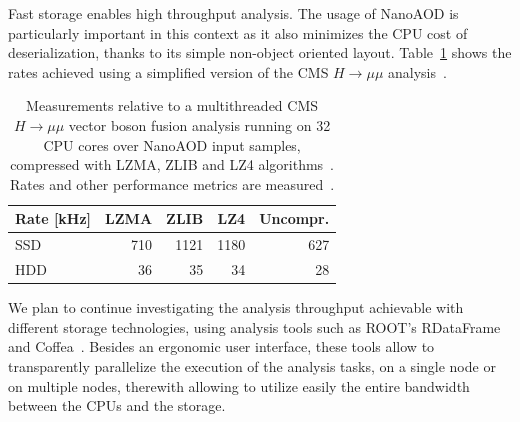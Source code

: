 \documentclass{cmspaper}
\newcommand{\trh}{\cellcolor{tablerowheader}}
\newcommand{\B}[1]{\textbf{#1}}
\begin{document}
Fast storage enables high throughput analysis. The usage of NanoAOD is particularly important in this context as it also minimizes the CPU cost of deserialization, thanks to its simple non-object oriented layout. Table~\ref{tab:ana_rates} shows the rates achieved using a simplified version of the CMS $H\rightarrow\mu\mu$ analysis~\cite{higgstomumu}.
\begin{table}[ht]
\begin{center}
\caption{Measurements relative to a multithreaded CMS $H\rightarrow \mu \mu$ vector boson fusion analysis running on 32 CPU cores over NanoAOD input samples, compressed with LZMA, ZLIB and LZ4 algorithms~\cite{Shadura_2020}. Rates and other performance metrics are measured~\cite{dawg}.}
\label{tab:ana_rates}
\begin{tabular}{lrrrr} 
\hline
\rowcolor{tableheader} \B{Rate [kHz]}      & \B{LZMA} & \B{ZLIB} & \B{LZ4} & \B{Uncompr.} \\
\hline \hline
\trh SSD & 710 & 1121 &  1180 & 627 \\
\trh HDD &  36 &   35 &    34 &  28 \\
\hline
\end{tabular}
\end{center}
\end{table}

We plan to continue investigating the analysis throughput achievable with different storage technologies, using analysis tools such as ROOT's RDataFrame~\cite{rdataframe} and Coffea~\cite{Smith:2020pxs}. Besides an ergonomic user interface, these tools allow to transparently parallelize the execution of the analysis tasks, on a single node or on multiple nodes, therewith allowing to utilize easily the entire bandwidth between the CPUs and the storage.

\end{document}
